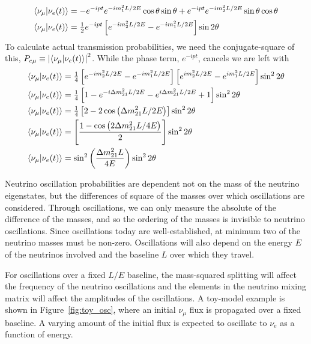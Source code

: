 \documentclass[main.tex]{subfiles}
\begin{document}
\begin{align}
    \left< \nu_{\mu} | \nu_{e}(t) \right> &= -e^{-ipt}e^{ -im_{1}^{2}L/2E} \cos\theta\sin\theta  + e^{-ipt}e^{ -im_{2}^{2}L/2E} \sin\theta\cos\theta \\
    \left< \nu_{\mu} | \nu_{e}(t) \right> &= \tfrac{1}{2}e^{-ipt}\left[e^{ -im_{2}^{2}L/2E} - e^{ -im_{1}^{2}L/2E}\right] \sin 2\theta
\end{align}
To calculate actual transmission probabilities, we need the conjugate-square of this, $P_{e\mu} \equiv \left|\left< \nu_{\mu}|\nu_{e}(t) \right>\right|^{2}$. While the phase term, $e^{-ipt}$, cancels we are left with 
\begin{align}
    \left< \nu_{\mu} | \nu_{e}(t) \right> &=\tfrac{1}{4} \left[e^{ -im_{2}^{2}L/2E} - e^{ -im_{1}^{2}L/2E}\right]\left[e^{ im_{2}^{2}L/2E} - e^{ im_{1}^{2}L/2E}\right] \sin^{2} 2\theta \\
    \left< \nu_{\mu} | \nu_{e}(t) \right> &=\tfrac{1}{4}\left[1 - e^{-i\Delta m_{21}^{2}L/2E}- e^{i\Delta m_{21}^{2}L/2E}  +1\right]\sin^{2} 2\theta\\
    \left< \nu_{\mu} | \nu_{e}(t) \right> &=\tfrac{1}{4}\left[2- 2\cos\left( \Delta m_{21}^{2}L/2E\right) \right]\sin^{2} 2\theta \\
    \left< \nu_{\mu} | \nu_{e}(t) \right> &=\left[\dfrac{1-\cos\left( 2\Delta m_{21}^{2}L/4E\right)}{2} \right]\sin^{2} 2\theta \\
    \left< \nu_{\mu} | \nu_{e}(t) \right> &=\sin^{2}\left( \dfrac{\Delta m_{21}^{2}L}{4E}\right) \sin^{2} 2\theta
\end{align}

Neutrino oscillation probabilities are dependent not on the mass of the neutrino eigenstates, but the differences of square of the masses over which oscillations are considered.
Through oscillations, we can only measure the absolute of the difference of the masses, and so the ordering of the masses is invisible to neutrino oscillations. 
Since oscillations today are well-established, at minimum two of the neutrino masses must be non-zero. 
Oscillations will also depend on the energy $E$ of the neutrinos involved and the baseline $L$ over which they travel. 

For oscillations over a fixed $L/E$ baseline, the mass-squared splitting will affect the frequency of the neutrino oscillations and the elements in the neutrino mixing matrix will affect the amplitudes of the oscillations. 
A toy-model example is shown in Figure~\ref{fig:toy_osc}, where an initial $\nu_{\mu}$ flux is propagated over a fixed baseline. 
A varying amount of the initial flux is expected to oscillate to $\nu_{e}$ as a function of energy. 
\end{document}
